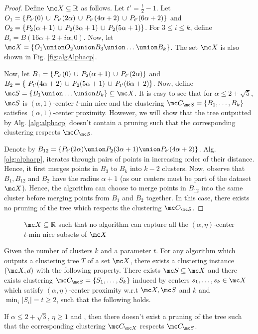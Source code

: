 \documentclass[11pt]{article}
\begin{document}
\begin{proof}
Define $\mc X \subseteq \mathbb{R}$ as follows. Let $t' = \frac{t}{2}-1$. Let $O_1 = \{P_{t'}(0) \thinspace\cup\thinspace P_{t'}(2\alpha) \thinspace\cup\thinspace P_{t'}(4\alpha+2) \thinspace\cup\thinspace P_{t'}(6\alpha+2)\}$ and $O_2 = \{P_{2}(\alpha+1) \thinspace\cup\thinspace P_{2}(3\alpha+1) \thinspace\cup\thinspace P_{2}(5\alpha+1) \}$. For $3\le i\le k$, define $B_i = B(16\alpha+2+i\alpha, 0)$. Now, let $\mc X = \{O_1 \union O_2 \union B_3 \union \ldots \union B_k\}$. The set $\mc X$ is also shown in Fig. \ref{fig:algAlphacp}.

Now, let $B_1 = \{P_{t'}(0) \thinspace\cup\thinspace  P_{2}(\alpha+1) \thinspace\cup\thinspace P_{t'}(2\alpha) \}$ and $B_2 = \{\ P_{t'}(4\alpha+2) \thinspace\cup\thinspace P_{2}(5\alpha+1)\thinspace\cup\thinspace P_{t'}(6\alpha+2)\}$. Now, define $\mc S = \{B_1 \union \ldots \union B_k\} \subseteq \mc X$. It is easy to see that for $\alpha \le 2+\sqrt{5}$, $\mc S$ is $(\alpha, 1)$-center $t$-min nice and the clustering $\mc C_{\mc S} = \{B_1, \ldots, B_k\}$ satisfies $(\alpha, 1)$-center proximity. However, we will show that the tree outputted by Alg. \ref{alg:alphacp} doesn't contain a pruning such that the corresponding clustering respects $\mc C_{\mc S}$.

Denote by $B_{12} = \{P_{t'}(2\alpha) \union P_{2}(3\alpha+1) \union P_{t'}(4\alpha+2) \}$. Alg. \ref{alg:alphacp}, iterates through pairs of points in increasing order of their distance. Hence, it first merges points in $B_3$ to $B_k$ into $k-2$ clusters. Now, observe that $B_1, B_{12}$ and $B_{2}$ have the radius $\alpha + 1$ (as our centers must be part of the dataset $\mc X$). Hence, the algorithm can choose to merge points in $B_{12}$ into the same cluster before merging points from $B_1$ and $B_2$ together. In this case, there exists no pruning of the tree which respects the clustering $\mc C_{\mc S}$.
\end{proof}

\begin{figure}[!ht]

\caption{$\mc X \subseteq \mathbb{R}$ such that no algorithm can capture all the $(\alpha, \eta)$-center $t$-min nice subsets of $\mc X$}
\label{fig:noalgalphacp}
\end{figure}

\begin{theorem}
\label{thm:noalgalphacp}
Given the number of clusters $k$ and a parameter $t$. For any algorithm which outputs a clustering tree $T$ of a set $\mc X$, there exists a clustering instance $(\mc X, d)$ with the following property. There exists $\mc S \subseteq \mc X$ and there exists clustering $\mc C_{\mc S} = \{S_1, \ldots, S_k\}$ induced by centers $s_1, \ldots, s_k \in \mc X$ which satisfy $(\alpha, \eta)$-center proximity w.r.t $\mc X, \mc S$ and $k$ and $ \min_i|S_i| = t \ge 2$, such that the following holds. 

If $\alpha \le 2 + \sqrt 3$, $\eta \ge 1$ and , then there doesn't exist a pruning of the tree such that the corresponding clustering $\mc C_{\mc X}$ respects $\mc C_{\mc S}$.
\end{theorem}
\end{document}
